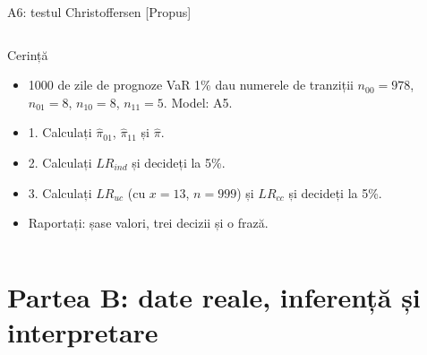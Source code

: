 \begin{frame}{A6: testul Christoffersen [Propus]}
\propsub
\itemsize{\scriptsize}
\begin{columns}[T]
\begin{column}{\taskw}
\begin{block}{Cerință}
\begin{itemize}
    \item 1000 de zile de prognoze VaR 1\% dau numerele de tranziții $n_{00} = 978$, $n_{01} = 8$, $n_{10} = 8$, $n_{11} = 5$. Model: A5.
    \item 1. Calculați $\hat\pi_{01}$, $\hat\pi_{11}$ și $\hat\pi$.
    \item 2. Calculați $LR_{ind}$ și decideți la 5\%.
    \item 3. Calculați $LR_{uc}$ (cu $x = 13$, $n = 999$) și $LR_{cc}$ și decideți la 5\%.
    \item Raportați: șase valori, trei decizii și o frază.
\end{itemize}
\end{block}
\end{column}
\begin{column}{\solw}
\end{column}
\end{columns}
\end{frame}


\section{Partea B: date reale, inferență și interpretare}

